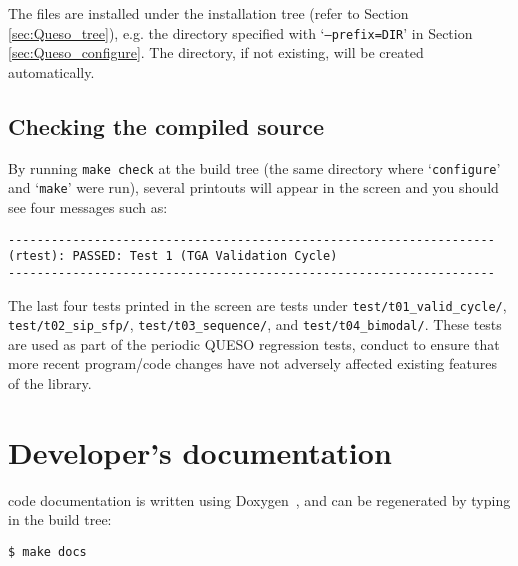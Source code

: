 The files are installed under the installation tree (refer to Section \ref{sec:Queso_tree}), e.g. the directory specified with `\texttt{--prefix=DIR}' in Section \ref{sec:Queso_configure}. The directory, if not existing, will be created automatically.%


\subsection{Checking the compiled source} \label{sc-checks}

By running \texttt{make check} at the build tree (the same directory where `\verb+configure+' and `\verb+make+' were run), several printouts will appear in the screen and you should see four messages such as:
\begin{lstlisting}
--------------------------------------------------------------------
(rtest): PASSED: Test 1 (TGA Validation Cycle)
--------------------------------------------------------------------
\end{lstlisting}

The last four tests printed in the screen are tests under \texttt{test/t01\_valid\_cycle/}, \linebreak
\texttt{test/t02\_sip\_sfp/}, \texttt{test/t03\_sequence/}, and  \texttt{test/t04\_bimodal/}. These tests are used as part of the periodic QUESO regression tests, conduct to ensure that more recent program/code changes have not adversely affected existing features of the library.




\section{\Queso{} Developer's documentation}\label{sec:Queso_docs}



\Queso{} code documentation is written using Doxygen~\cite{Doxygen}, and can be regenerated by typing in the build tree:
\begin{lstlisting}
$ make docs
\end{lstlisting}

